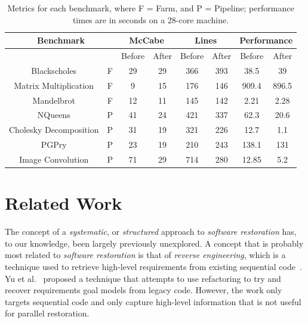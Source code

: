\begin{table}
	\begin{tabular}{|c|c|c|c|c|c|c|c|}
		\hline \hline
		\multicolumn{2}{|c|}{\textbf{Benchmark}} & \multicolumn{2}{|c|}{McCabe} & \multicolumn{2}{|c|}{Lines} & \multicolumn{2}{|c|}{Performance}  \\
		\hline
		& & Before & After & Before & After & Before & After  \\
		\hline
		Blackscholes & F &  29 & 29 & 366 & 393 & 38.5 & 39  \\
		Matrix Multiplication & F & 9 & 15 & 176 & 146 & 909.4 & 896.5  \\
		Mandelbrot & F  & 12 & 11 & 145 & 142 & 2.21 & 2.28 \\
		NQueens & P & 41 & 24 & 421 & 337 & 62.3 & 20.6  \\
		Cholesky Decomposition & P & 31  & 19 & 321 & 226 & 12.7 & 1.1 \\
		PGPry & P & 23 & 19 & 210 & 243 & 138.1 & 131 \\
		Image Convolution & P & 71 & 29 & 714 & 280 & 12.85  & 5.2 \\
		\hline \hline
	\end{tabular}
	\caption{Metrics for each benchmark, where F = Farm, and P = Pipeline; performance times are in seconds on a 28-core machine.}
	\label{fig:benchmarks2}
\end{table}

\section{Related Work}


The concept of a \emph{systematic}, or \emph{structured} approach to \emph{software restoration} has, to our knowledge, been largely previously unexplored. A concept that is probably most related to \emph{software restoration} is that of \emph{reverse engineering}, which is a technique used to retrieve high-level requirements from existing sequential code~\cite{10.1145/287000.287001}\cite{10.1145/337180.337234}. Yu et al.~\cite{10.1109/RE.2005.61} proposed a technique that attempts to use refactoring to try and recover requirements goal models from legacy code. However, the work only targets sequential code and only capture high-level information that is not useful for parallel restoration.

